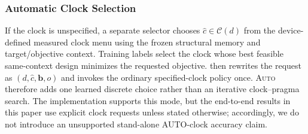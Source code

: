 \subsubsection{Automatic Clock Selection}
\label{subsubsec:auto-clock}

If the clock is unspecified, a separate selector chooses $\hat c\in\mathcal C(d)$ from the device-defined measured clock menu using the frozen structural memory and target/objective context.
Training labels select the clock whose best feasible same-context design minimizes the requested objective. \framework then rewrites the request as $(d,\hat c,\mathbf b,o)$ and invokes the ordinary specified-clock policy once. \textsc{Auto} therefore adds one learned discrete choice rather than an iterative clock--pragma search. The implementation supports this mode, but the end-to-end results in this paper use explicit clock requests unless stated otherwise; accordingly, we do not introduce an unsupported stand-alone AUTO-clock accuracy claim. 